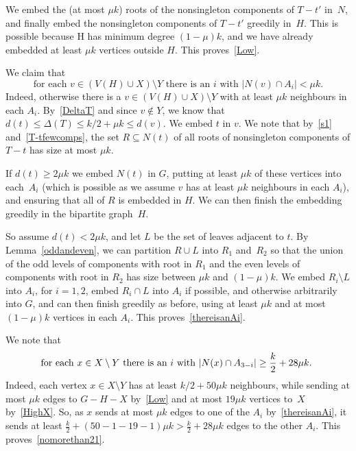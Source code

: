 \documentclass[12pt]{article}
\begin{document}
We  embed the (at most $\mu k$) roots of the nonsingleton components of $T-t'$ in~$N$, and
 finally embed the nonsingleton components of $T-t'$ greedily in~$H$. This is possible  because H has minimum degree $(1-\mu)k$, and  we have already embedded at least $\mu k$ vertices   outside $H$. 
This proves~\eqref{Low}.



We claim that 
\begin{equation}\label{thereisanAi}
\text{for each
 $v\in (V(H)\cup X)\setminus Y$ there is an $i$ with  $|N(v)\cap A_i|<\mu k$.}
 \end{equation}
 Indeed, otherwise there is a  $v\in (V(H)\cup X)\setminus Y$ with at least $\mu k$ neighbours in each $A_i$. By~\eqref{DeltaT} and since $v\notin Y$, we know that $d(t)\le\Delta(T)\le k/2+\mu k\le d(v)$. We embed $t$ in $v$.  We note that by~\eqref{s1} and~\eqref{T-tfewcomps},  the set $R\subseteq N(t)$ of all roots of nonsingleton components of $T-t$ has size  at most $\mu k$.
 
 If $d(t)\ge 2\mu k$  we embed $N(t)$ in $G$, putting at least $\mu k$ of these vertices into each~$A_i$ (which is possible as we assume $v$ has at least $\mu k$ neighbours in each $A_i$), and ensuring that all of $R$ is embedded in $H$. We can then finish the embedding greedily in the  bipartite graph~$H$. 
 

So assume $d(t)< 2\mu k$, and let  $L$ be the set of leaves adjacent to $t$.  By Lemma~\ref{oddandeven}, 
 we can partition $R\cup L$ into $R_1$ and~$R_2$ so that the union of the odd levels of components with root in $R_1$ and  the even levels of components with root in $R_2$ has size between $\mu k$ and $(1-\mu )k$. 
 We embed $R_i\setminus L$   into $A_i$, for $i=1,2$, embed $R_i\cap L$   into $A_i$ if possible, and otherwise arbitrarily into $G$,  and can then finish greedily as before, using at least $\mu k$ and at most $(1-\mu )k$ vertices  in each $A_i$. This proves~\eqref{thereisanAi}.
 

We note that  
\begin{equation}\label{nomorethan21}
\text{\ \hskip-.352cm for each $x\in X\setminus Y$ there is an $i$ with $|N(x)\cap A_{3-i}|\ge \frac{k}{2}+28\mu k$.\hskip-.1cm}
 \end{equation}
 Indeed, each vertex  $x\in X\setminus Y$ has at least $k/2+50\mu k$ neighbours, while sending  at most $\mu k$ edges to $G-H-X$  by~\eqref{Low} 
 and at most $19\mu k$ vertices to~$X$ by~\eqref{HighX}. So, as $x$ sends at most 
 $\mu k$ edges to one of the $A_i$ by~\eqref{thereisanAi}, it sends at least $\frac{k}{2}+(50-1-19-1)\mu k>\frac{k}{2} +28\mu k$ edges to the other $A_i$. This proves~\eqref{nomorethan21}.
 
\end{document}
